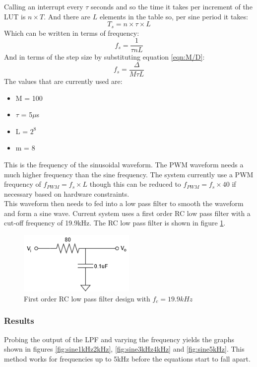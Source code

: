 \documentclass[12pt, a4paper]{article}
\begin{document}
Calling an interrupt every $\tau$ seconds and so the time it takes per increment of the LUT is $n\times T$. And there are $L$ elements in the table so, per sine period it takes:
\begin{equation}
	T_s = n\times \tau\times L
\end{equation}
Which can be written in terms of frequency:
\begin{equation}
	f_s = \frac{1}{\tau nL}
\end{equation}
And in terms of the step size by substituting equation \ref{eqn:M/D}:
\begin{equation}
	f_s = \frac{\Delta}{M\tau L}
\end{equation}
The values that are currently used are:
\begin{itemize}
	\item M = 100
	\item $\tau$ = 5$\mu$s
	\item L = $2^8$
	\item m = 8
\end{itemize}
This is the frequency of the sinusoidal waveform. The PWM waveform needs a much higher frequency than the sine frequency. The system currently use a PWM frequency of $f_{PWM} = f_s \times L$ though this can be reduced to $f_{PWM} = f_s \times 40$ if necessary based on hardware constraints.\\

This waveform then needs to fed into a low pass filter to smooth the waveform and form a sine wave. Current system uses a first order RC low pass filter with a cut-off frequency of 19.9kHz. The RC low pass filter is shown in figure \ref{fig:RCLPF1}.
\begin{figure} [!htb]
	\hfill\includegraphics[width=0.5\textwidth]{./Figures/RC_LPF}\hspace{\fill}
	\caption{First order RC low pass filter design with $f_c = 19.9kHz$}
	\label{fig:RCLPF1}
\end{figure}

\subsubsection{Results}
Probing the output of the LPF and varying the frequency yields the graphs shown in figures \ref{fig:sine1kHz2kHz}, \ref{fig:sine3kHz4kHz} and \ref{fig:sine5kHz}. This method works for frequencies up to 5kHz before the equations start to fall apart. 
\end{document}
